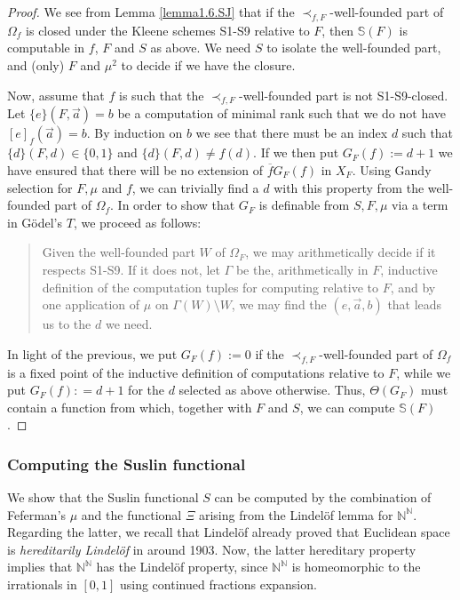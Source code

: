 \documentclass[reqno]{amsart}
\def\N{{\mathbb  N}}
\def\SJ{\mathbb{S}}
\numberwithin{equation}{section}
\numberwithin{thm}{section}
\begin{document}
\begin{proof}
We see from Lemma \ref{lemma1.6.SJ} that if the $\prec_{f,F}$-well-founded part of $\Omega_f$ is closed under the Kleene schemes S1-S9 relative to $F$, then $\SJ(F)$ is computable in $f$, $F$ and $S$ as above. We need $S$ to isolate the well-founded part, and (only) $F$ and $\mu^{2}$ to decide if we have the closure. 

\smallskip

Now, assume that $f$ is such that the $\prec_{f,F}$-well-founded part is not S1-S9-closed. Let $\{e\}(F,\vec a) = b$ be a computation of minimal rank such that we do not have $[e]_f(\vec a) = b$. By induction on $b$ we see that there must be an index $d$ such that $\{d\}(F,d) \in \{0,1\}$ and $\{d\}(F,d) \neq f(d)$. If we then put $G_F(f):= d+1$ we have ensured that there will be no extension of $\overline f G_F(f)$ in $X_F$. Using Gandy selection for $F,\mu$ and $f$, we can trivially find a $d$ with this property from the well-founded part of $\Omega_f$.  
In order to show that $G_F$ is definable from $S,F,\mu$ via a term in G\"odel's $T$, we proceed as follows:
\begin{quote}
Given the well-founded part $W$ of $\Omega_F$, we may arithmetically decide if it respects S1-S9. If it does not, let $\Gamma$ be the, arithmetically in $F$, inductive definition of the computation tuples for computing relative to $F$, and by one application of $\mu$ on $\Gamma(W) \setminus W$, we may find the $(e,\vec a , b)$ that leads us to the $d$ we need.
\end{quote}
In light of the previous, we put $G_{F}(f) := 0$ if the $\prec_{f,F}$-well-founded part of $\Omega_f$ is a fixed point of the inductive definition of computations relative to $F$, while we put $G_{F}(f): = d+1$ for the $d$ selected as above otherwise.  Thus,  $\Theta(G_F)$ must contain a function from which, together with $F$ and $S$, we can compute $\SJ(F)$. 
\end{proof}

\subsubsection{Computing the Suslin functional}\label{lindeb}
We show that the Suslin functional $S$ can be computed by the combination of Feferman's $\mu$ and the functional $\Xi$ arising from the Lindel\"of lemma for $\N^{\N}$.  
Regarding the latter, we recall that Lindel\"of already proved that Euclidean space is \emph{hereditarily Lindel\"of} in \cite{blindeloef} around 1903.  
Now, the latter hereditary property implies that $\N^{\N}$ has the Lindel\"of property, since $\N^\N$ is homeomorphic to the irrationals in $[0,1]$ using continued fractions expansion.
\end{document}
